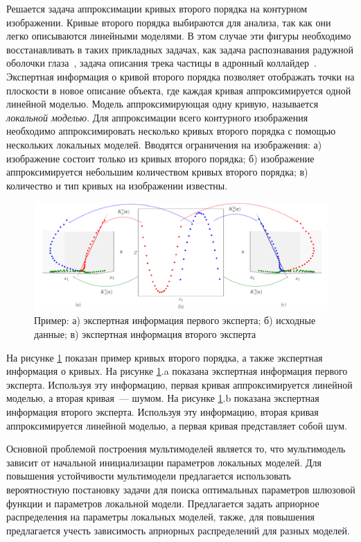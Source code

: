 Решается задача аппроксимации кривых второго порядка на контурном изображении. Кривые второго порядка выбираются для анализа, так как они легко описываются линейными моделями. В этом случае эти фигуры необходимо восстанавливать в таких прикладных задачах, как задача распознавания радужной оболочки глаза~\cite{Matveev2010,Matveev2014,Bowyer2010}, задача описания трека частицы в адронный коллайдер~\cite{Dalila2018}. Экспертная информация о кривой второго порядка позволяет отображать точки на плоскости в новое описание объекта, где каждая кривая аппроксимируется одной линейной моделью. Модель аппроксимирующая одну кривую, называется \textit{локальной моделью}. Для аппроксимации всего контурного изображения необходимо аппроксимировать несколько кривых второго порядка с помощью нескольких локальных моделей. Вводятся ограничения на изображения: а) изображение состоит только из кривых второго порядка; б) изображение аппроксимируется небольшим количеством кривых второго порядка; в) количество и тип кривых на изображении известны.

\begin{figure}[!ht]
\center
     \includegraphics[width=\textwidth]{results/priorexpertfig/explanation}
     \caption{Пример: а) экспертная информация первого эксперта; б) исходные данные; в) экспертная информация второго эксперта}
    \label{intro:fig2}
\end{figure}
На рисунке \ref{intro:fig2} показан пример кривых второго порядка, а также экспертная информация о кривых. На рисунке \ref{intro:fig2}.a показана экспертная информация первого эксперта. Используя эту информацию, первая кривая аппроксимируется линейной моделью, а вторая кривая~--- шумом. На рисунке \ref{intro:fig2}.b показана экспертная информация второго эксперта. Используя эту информацию, вторая кривая аппроксимируется линейной моделью, а первая кривая представляет собой шум.

Основной проблемой построения мультимоделей является то, что мультимодель зависит от начальной инициализации параметров локальных моделей. Для повышения устойчивости мультимодели предлагается использовать вероятностную постановку задачи для поиска оптимальных параметров шлюзовой функции и параметров локальной модели. Предлагается задать априорное распределения на параметры локальных моделей, также, для повышения предлагается учесть зависимость априорных распределений для разных моделей.

